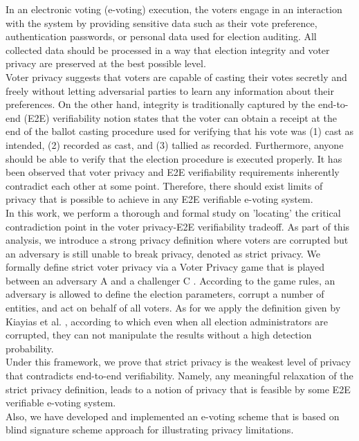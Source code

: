 % 
% 
%
In an electronic voting (e-voting) execution, the voters engage in an interaction with the system by providing sensitive data such as their vote preference, authentication passwords, or personal data used for election auditing. All collected data should be processed in a way that election integrity and voter privacy are preserved at the best possible level. \\
Voter privacy suggests that voters are capable of casting their votes secretly and freely without letting adversarial parties to learn any information about their preferences. On the other hand, integrity is traditionally captured by  the end-to-end (E2E) verifiability notion  states that the voter can obtain a receipt at the end of the ballot casting procedure  used for verifying that his vote was (1) cast as intended, (2) recorded as cast, and (3) tallied as recorded. Furthermore, anyone should be able to verify that the election procedure is executed properly. It has been observed that voter privacy and E2E verifiability requirements inherently contradict each other at some point. Therefore, there should exist limits of privacy that is possible to achieve in any E2E verifiable e-voting system.\\
In this work, we perform a thorough and formal study on 'locating' the critical contradiction point in the voter privacy-E2E verifiability tradeoff. As part of this analysis, we introduce a strong privacy definition where voters are corrupted but an adversary is still unable to break privacy, denoted as  strict  privacy. We formally define strict voter privacy via a Voter Privacy game that is played between an adversary  A and a challenger  C . According to the game rules, an adversary is allowed to define the election parameters, corrupt a number of entities, and act on behalf of all voters. As for we apply the  definition given by Kiayias et al. \cite{Kiayias2015}, according to which even when all election administrators are corrupted, they can not manipulate the results without a high detection probability.\\
Under this framework, we prove that strict privacy is the weakest level of privacy that contradicts end-to-end verifiability. Namely, any meaningful relaxation of the strict privacy definition, leads to a notion of privacy that is feasible by some E2E verifiable e-voting system.\\
Also, we have developed and implemented an e-voting scheme that is based on blind signature scheme approach for illustrating privacy limitations.
